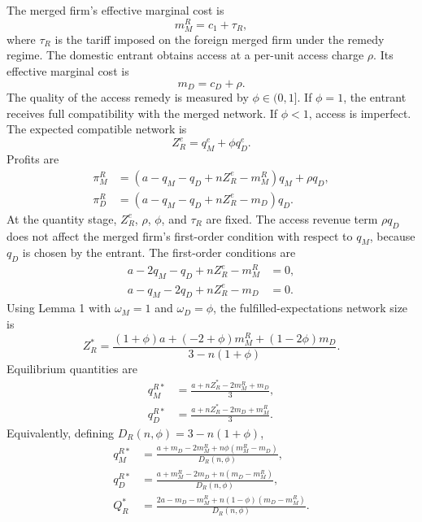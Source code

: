 \documentclass[12pt]{article}
\begin{document}
The merged firm's effective marginal cost is
\begin{equation}
m_M^R=c_1+\tau_R,
\label{eq:mM_regime_R}
\end{equation}
where $\tau_R$ is the tariff imposed on the foreign merged firm under the remedy regime. The domestic entrant obtains access at a per-unit access charge $\rho$. Its effective marginal cost is
\begin{equation}
m_D=c_D+\rho.
\label{eq:mD_regime_R}
\end{equation}
The quality of the access remedy is measured by $\phi\in(0,1]$. If $\phi=1$, the entrant receives full compatibility with the merged network. If $\phi<1$, access is imperfect. The expected compatible network is
\begin{equation}
Z_R^e=q_M^e+\phi q_D^e.
\label{eq:network_regime_R}
\end{equation}
Profits are
\begin{align}
\pi_M^R&=(a-q_M-q_D+nZ_R^e-m_M^R)q_M+\rho q_D,\label{eq:profit_M_regime_R}\\
\pi_D^R&=(a-q_M-q_D+nZ_R^e-m_D)q_D.\label{eq:profit_D_regime_R}
\end{align}
At the quantity stage, $Z_R^e$, $\rho$, $\phi$, and $\tau_R$ are fixed. The access revenue term $\rho q_D$ does not affect the merged firm's first-order condition with respect to $q_M$, because $q_D$ is chosen by the entrant. The first-order conditions are
\begin{align}
a-2q_M-q_D+nZ_R^e-m_M^R&=0,\label{eq:foc_M_regime_R}\\
a-q_M-2q_D+nZ_R^e-m_D&=0.\label{eq:foc_D_regime_R}
\end{align}
Using Lemma 1 with $\omega_M=1$ and $\omega_D=\phi$, the fulfilled-expectations network size is
\begin{equation}
Z_R^*=\frac{(1+\phi)a+(-2+\phi)m_M^R+(1-2\phi)m_D}{3-n(1+\phi)}.
\label{eq:ZR_star}
\end{equation}
Equilibrium quantities are
\begin{align}
q_M^{R*}&=\frac{a+nZ_R^*-2m_M^R+m_D}{3},\label{eq:qM_regime_R_star}\\
q_D^{R*}&=\frac{a+nZ_R^*-2m_D+m_M^R}{3}.\label{eq:qD_regime_R_star}
\end{align}
Equivalently, defining $D_R(n,\phi)=3-n(1+\phi)$,
\begin{align}
q_M^{R*}&=\frac{a+m_D-2m_M^R+n\phi(m_M^R-m_D)}{D_R(n,\phi)},\label{eq:qMR_simplified}\\
q_D^{R*}&=\frac{a+m_M^R-2m_D+n(m_D-m_M^R)}{D_R(n,\phi)},\label{eq:qDR_simplified}\\
Q_R^*&=\frac{2a-m_D-m_M^R+n(1-\phi)(m_D-m_M^R)}{D_R(n,\phi)}.\label{eq:QR_simplified}
\end{align}
\end{document}
